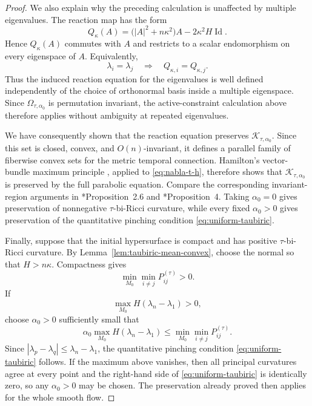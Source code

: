 \documentclass[11pt,reqno]{amsart}
\theoremstyle{definition}
\theoremstyle{remark}
\numberwithin{equation}{section}
\begin{document}
\begin{proof}
We also explain why the preceding calculation is unaffected by
multiple eigenvalues.  The reaction map has the form
\begin{equation*}
 Q_\kappa(A)
 =\bigl(|A|^2+n\kappa^2\bigr)A
  -2\kappa^2H\operatorname{Id}.
\end{equation*}
Hence $Q_\kappa(A)$ commutes with $A$ and restricts to a scalar
endomorphism on every eigenspace of $A$.  Equivalently,
\begin{equation*}
 \lambda_i=\lambda_j
 \quad\Longrightarrow\quad
 Q_{\kappa,i}=Q_{\kappa,j}.
\end{equation*}
Thus the induced reaction equation for the eigenvalues is well defined
independently of the choice of orthonormal basis inside a multiple
eigenspace.  Since $\Omega_{\tau,\alpha_0}$ is permutation invariant,
the active-constraint calculation above therefore applies without
ambiguity at repeated eigenvalues.

We have consequently shown that the reaction equation preserves
$\mathcal K_{\tau,\alpha_0}$.  Since this set is closed, convex, and
$O(n)$-invariant, it defines a parallel family of fiberwise convex sets
for the metric temporal connection.  Hamilton's vector-bundle maximum
principle \cite{Ham86}, applied to \eqref{eq:nabla-t-h}, therefore shows
that $\mathcal K_{\tau,\alpha_0}$ is preserved by the full parabolic
equation.  Compare the corresponding invariant-region arguments in
\cite{HS09}*{Proposition~2.6} and \cite{AC17}*{Proposition~4}.
Taking $\alpha_0=0$ gives preservation of nonnegative
$\tau$-bi-Ricci curvature, while every fixed $\alpha_0>0$ gives
preservation of the quantitative pinching condition
\eqref{eq:uniform-taubiric}.

Finally, suppose that the initial hypersurface is compact and has
positive $\tau$-bi-Ricci curvature.  By
Lemma~\ref{lem:taubiric-mean-convex}, choose the normal so that
$H>n\kappa$.  Compactness gives
\begin{equation*}
 \min_{M_0}\min_{i\ne j}P_{ij}^{(\tau)}>0.
\end{equation*}
If
\begin{equation*}
 \max_{M_0}H(\lambda_n-\lambda_1)>0,
\end{equation*}
choose $\alpha_0>0$ sufficiently small that
\begin{equation*}
 \alpha_0\max_{M_0}H(\lambda_n-\lambda_1)
 \leq
 \min_{M_0}\min_{i\ne j}P_{ij}^{(\tau)}.
\end{equation*}
Since $ |\lambda_p-\lambda_q|
 \leq\lambda_n-\lambda_1$,  
the quantitative pinching condition
\eqref{eq:uniform-taubiric} follows.  If the maximum above vanishes,
then all principal curvatures agree at every point and the right-hand
side of \eqref{eq:uniform-taubiric} is identically zero, so any
$\alpha_0>0$ may be chosen.  The preservation already proved then
applies for the whole smooth flow.
\end{proof}
\end{document}
